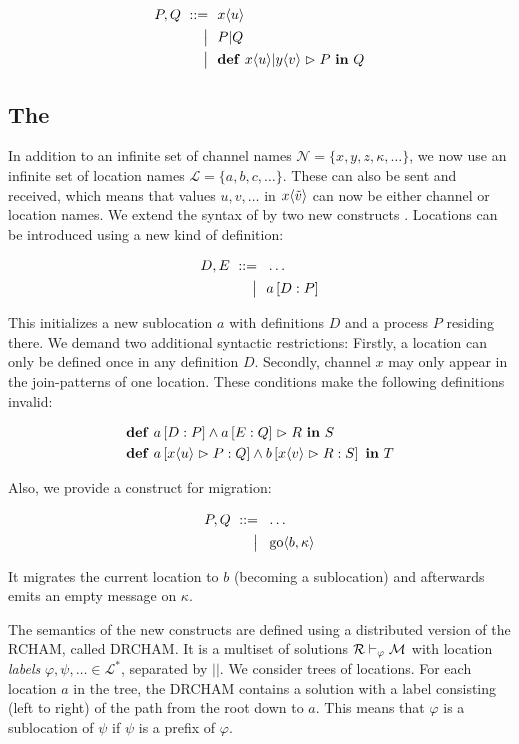 \begin{align*}
  P, Q
  \ ::=&\ \  x\langle u\rangle
  \\ \big|&\ \  P | Q
  \\ \big|&\ \  \textbf{\textup{def}} \ x\langle u\rangle | y\langle v\rangle \vartriangleright P \ \textbf{\textup{in}} \ Q
\end{align*}

\pagebreak

\subsection{The \DistJoinCalc}

In addition to an infinite set of channel names
$ \mathcal{N} = \{ x, y, z, \kappa, \ldots \} $,
we now use an infinite set of location names
$ \mathcal{L} = \{ a, b, c, \ldots \} $.
These can also be sent and received, which means that values
$ u, v, \ldots $ in $ x\langle\tilde{v}\rangle $
can now be either channel or location names.
We extend the syntax of \joincalc by two new constructs
\cite{fournet_calculus_1996}.
Locations can be introduced using a new kind of definition:

\begin{align*}
  D, E
  \ ::=&\ \  \dots
  \\ \big|&\ \  a \left[ D : P \right]
\end{align*}

This initializes a new sublocation $a$ with definitions $D$
and a process $P$ residing there.
We demand two additional syntactic restrictions:
Firstly, a location can only be defined once in any definition $D$.
Secondly, channel $x$ may only appear in the join-patterns of one location.
These conditions make the following definitions invalid:

\begin{align*}
  &\textbf{\textup{def}} \ a \left[ D : P \right] \wedge a \left[ E : Q \right] \vartriangleright R \ \textbf{\textup{in}} \ S
  \\
  &\textbf{\textup{def}} \ a \left[ x\langle u\rangle \vartriangleright P : Q \right]
     \wedge
     b \left[ x\langle v\rangle \vartriangleright R : S \right]
      \ \textbf{\textup{in}} \ T
\end{align*}

Also, we provide a construct for migration:

\begin{align*}
  P, Q
  \ ::=&\ \  \dots
  \\ \big|&\ \  \operatorname{go} \langle b, \kappa \rangle
\end{align*}

It migrates the current location to $b$ (becoming a sublocation)
and afterwards emits an empty message on $\kappa$.

The semantics of the new constructs are defined using a distributed version
of the RCHAM, called DRCHAM.
It is a multiset of solutions
$ \mathcal{R} \vdash_{\varphi} \mathcal{M} $
with location \emph{labels}
$ \varphi, \psi, \ldots \in \mathcal{L}^* $,
separated by $||$.
We consider trees of locations.
For each location $a$ in the tree,
the DRCHAM contains a solution with a label
consisting (left to right) of the path from the root down to $a$.
This means that $\varphi$ is a sublocation of $\psi$
if $\psi$ is a prefix of $\varphi$.

